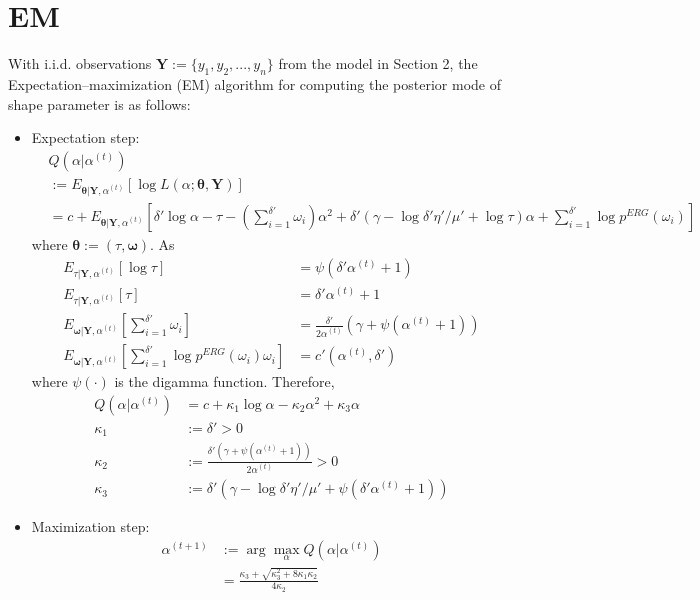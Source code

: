 \documentclass[11pt, oneside]{article}
\begin{document}
\section{EM}
With i.i.d. observations $\bm{Y}:=\{y_1, y_2, ..., y_n\}$ from the model in Section 2, the Expectation–maximization (EM) algorithm for computing the posterior mode of shape parameter is as follows:
\begin{itemize}
	\item Expectation step:
	\begin{align*}
	&Q(\alpha | \alpha^{(t)}) \\
	&:= E_{\bm{\theta} | \bm{Y}, \alpha^{(t)}} \left[\log L(\alpha; \bm{\theta, Y})\right] \\
	&= c + E_{\bm{\theta} | \bm{Y}, \alpha^{(t)}}\left[\delta'\log \alpha - \tau - \left(\sum_{i=1}^{\delta'} \omega_i\right) \alpha^2 + \delta'(\gamma-\log\delta'\eta'/\mu' + \log\tau) \alpha + \sum_{i=1}^{\delta'} \log p^{ERG}(\omega_i)\right]
	\end{align*}
where $\bm\theta := (\tau, \bm{\omega})$. As
\begin{align*}
E_{\tau| \bm{Y}, \alpha^{(t)}}[\log\tau] &= \psi(\delta'\alpha^{(t)} + 1) \\
E_{\tau| \bm{Y}, \alpha^{(t)}}[\tau] &= \delta'\alpha^{(t)} + 1\\
E_{\bm{\omega} | \bm{Y}, \alpha^{(t)}}\left[\sum_{i=1}^{\delta'} \omega_i\right] &= \frac{\delta'}{2\alpha^{(t)}}\left(\gamma + \psi(\alpha^{(t)} + 1)\right)\\
E_{\bm{\omega} | \bm{Y}, \alpha^{(t)}}\left[\sum_{i=1}^{\delta'} \log p^{ERG}(\omega_i) \omega_i\right] &= c'(\alpha^{(t)},\delta')
\end{align*}
where $\psi(\cdot)$ is the digamma function. Therefore,
\begin{align}
Q(\alpha | \alpha^{(t)})
&= c + \kappa_1 \log\alpha - \kappa_2 \alpha^2 + \kappa_3 \alpha \\
\kappa_1 &:= \delta' > 0\\
\kappa_2 &:=  \frac{\delta'\left(\gamma + \psi(\alpha^{(t)} + 1)\right)}{2\alpha^{(t)}} > 0\\
\kappa_3 &:= \delta'\left(\gamma-\log\delta'\eta'/\mu' + \psi(\delta'\alpha^{(t)} + 1)\right)
\end{align}
	\item Maximization step:
	\begin{align}
	\alpha^{(t+1)} &:= \arg\max_\alpha Q(\alpha | \alpha^{(t)}) \\
	&= \frac{\kappa_3 + \sqrt{\kappa_3^2 + 8\kappa_1\kappa_2}}{4\kappa_2}
	\end{align}

\end{itemize}
\end{document}
